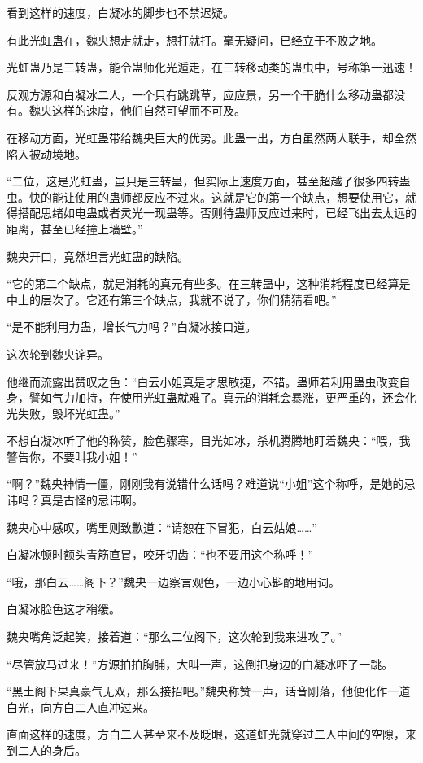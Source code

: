 \begin{this_body}
看到这样的速度，白凝冰的脚步也不禁迟疑。

有此光虹蛊在，魏央想走就走，想打就打。毫无疑问，已经立于不败之地。

光虹蛊乃是三转蛊，能令蛊师化光遁走，在三转移动类的蛊虫中，号称第一迅速！

反观方源和白凝冰二人，一个只有跳跳草，应应景，另一个干脆什么移动蛊都没有。魏央这样的速度，他们自然可望而不可及。

在移动方面，光虹蛊带给魏央巨大的优势。此蛊一出，方白虽然两人联手，却全然陷入被动境地。

“二位，这是光虹蛊，虽只是三转蛊，但实际上速度方面，甚至超越了很多四转蛊虫。快的能让使用的蛊师都反应不过来。这就是它的第一个缺点，想要使用它，就得搭配思绪如电蛊或者灵光一现蛊等。否则待蛊师反应过来时，已经飞出去太远的距离，甚至已经撞上墙壁。”

魏央开口，竟然坦言光虹蛊的缺陷。

“它的第二个缺点，就是消耗的真元有些多。在三转蛊中，这种消耗程度已经算是中上的层次了。它还有第三个缺点，我就不说了，你们猜猜看吧。”

“是不能利用力蛊，增长气力吗？”白凝冰接口道。

这次轮到魏央诧异。

他继而流露出赞叹之色：“白云小姐真是才思敏捷，不错。蛊师若利用蛊虫改变自身，譬如气力加持，在使用光虹蛊就难了。真元的消耗会暴涨，更严重的，还会化光失败，毁坏光虹蛊。”

不想白凝冰听了他的称赞，脸色骤寒，目光如冰，杀机腾腾地盯着魏央：“喂，我警告你，不要叫我小姐！”

“啊？”魏央神情一僵，刚刚我有说错什么话吗？难道说“小姐”这个称呼，是她的忌讳吗？真是古怪的忌讳啊。

魏央心中感叹，嘴里则致歉道：“请恕在下冒犯，白云姑娘……”

白凝冰顿时额头青筋直冒，咬牙切齿：“也不要用这个称呼！”

“哦，那白云……阁下？”魏央一边察言观色，一边小心斟酌地用词。

白凝冰脸色这才稍缓。

魏央嘴角泛起笑，接着道：“那么二位阁下，这次轮到我来进攻了。”

“尽管放马过来！”方源拍拍胸脯，大叫一声，这倒把身边的白凝冰吓了一跳。

“黑土阁下果真豪气无双，那么接招吧。”魏央称赞一声，话音刚落，他便化作一道白光，向方白二人直冲过来。

直面这样的速度，方白二人甚至来不及眨眼，这道虹光就穿过二人中间的空隙，来到二人的身后。


\end{this_body}
